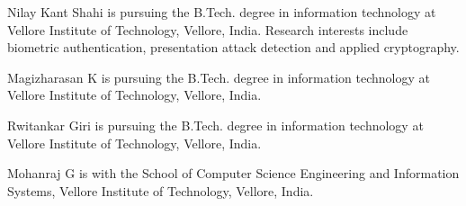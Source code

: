 \documentclass{ieeeaccess}
\begin{document}
\begin{IEEEbiographynophoto}{Nilay Kant Shahi} is pursuing the B.Tech. degree in information
technology at Vellore Institute of Technology, Vellore, India. Research interests include
biometric authentication, presentation attack detection and applied cryptography.  %
\end{IEEEbiographynophoto}

\begin{IEEEbiographynophoto}{Magizharasan K} is pursuing the B.Tech. degree in information technology
at Vellore Institute of Technology, Vellore, India.  %
\end{IEEEbiographynophoto}

\begin{IEEEbiographynophoto}{Rwitankar Giri} is pursuing the B.Tech. degree in information technology
at Vellore Institute of Technology, Vellore, India.  %
\end{IEEEbiographynophoto}

\begin{IEEEbiographynophoto}{Mohanraj G} is with the School of Computer Science Engineering and
Information Systems, Vellore Institute of Technology, Vellore, India.  %
\end{IEEEbiographynophoto}

\EOD
\end{document}
